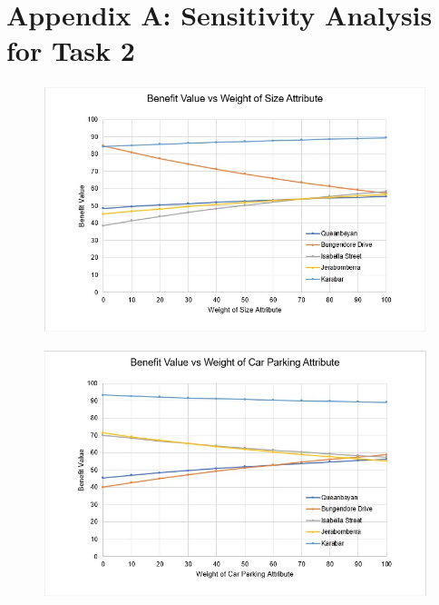 \documentclass[11pt, a4paper]{article}
\begin{document}
    \newpage
    \printbibliography

    \newpage
    \section*{Appendix A: Sensitivity Analysis for Task 2}

        \begin{figure}[!ht]
            \centering
            \includegraphics[width=\textwidth]{appendices/1a.jpg}
        \end{figure}

        \begin{figure}[!ht]
            \centering
            \includegraphics[width=\textwidth]{appendices/1b.jpg}
        \end{figure}
\end{document}
